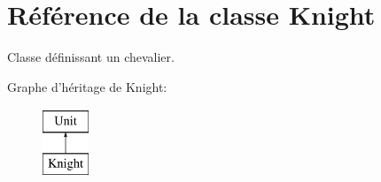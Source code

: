 \hypertarget{classKnight}{\section{Référence de la classe Knight}
\label{classKnight}
}


Classe définissant un chevalier.  


Graphe d'héritage de Knight\+:\begin{figure}[H]
\begin{center}
\leavevmode
\includegraphics[height=2.000000cm]{classKnight}
\end{center}
\end{figure}
